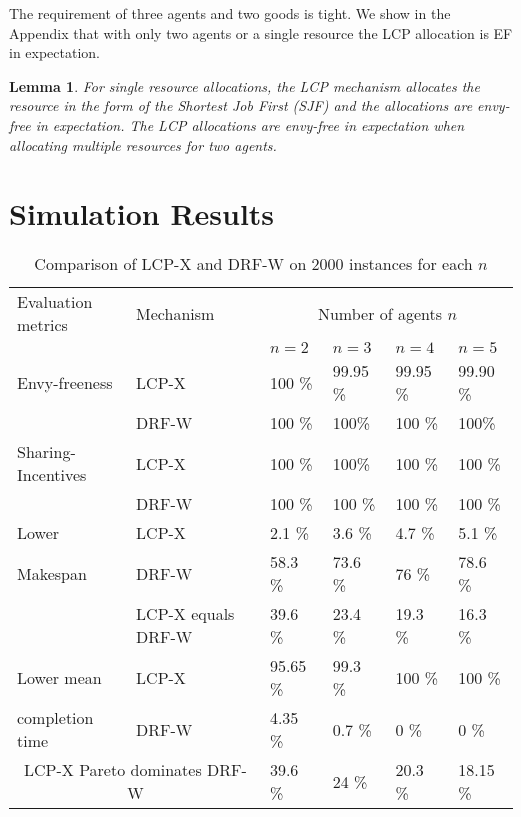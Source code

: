 \documentclass[letterpaper]{article} %
\newtheorem{lemma}{Lemma}
\theoremstyle{definition}
\begin{document}
The requirement of three agents and two goods is tight.  We show in the Appendix that with only two agents or a single resource the LCP allocation is EF in expectation.


\begin{lemma} \label{lcp-1res_and_2agents}
For single resource allocations, the LCP mechanism allocates the resource in the form of the Shortest Job First (SJF) and the allocations are envy-free in expectation. The LCP allocations are envy-free in expectation when allocating multiple resources for two agents.
\end{lemma}

\section{Simulation Results} \label{simulation}

\begin{table*}[t]
\centering
\begin{tabular}{|p{32mm}| p{32mm}| p{15mm}| p{15mm}| p{15mm}|p{15mm}|}
\hline
Evaluation metrics & Mechanism & \multicolumn{4}{c|}{Number of agents $n$}\\
\cline{3-6}
&& $n = 2$ & $n = 3$ & $n = 4$ & $n = 5$\\
\hline
Envy-freeness & LCP-X &  100 \% &  99.95 \% &  99.95 \% &  99.90 \%\\
\cline{2-6}
& DRF-W  &  100 \% &  100\% &  100 \% &  100\%\\
\hline
Sharing-Incentives & LCP-X &  100 \% &  100\% &  100 \% &  100 \%\\
\cline{2-6}
& DRF-W  &  100 \% &  100 \% &  100 \% &  100 \%\\
\hline
Lower & LCP-X &  2.1 \% &  3.6 \% &  4.7 \% &  5.1 \%\\
\cline{2-6}
Makespan & DRF-W  &  58.3 \% &  73.6 \% &  76 \% &  78.6 \%\\
\cline{2-6}
& LCP-X equals DRF-W  &  39.6 \% &  23.4 \% &  19.3 \% &  16.3 \% \\
\hline
Lower mean & LCP-X &  95.65 \% &  99.3 \% &  100 \% &  100 \%\\
\cline{2-6}
completion time & DRF-W &  4.35 \% &  0.7 \% &  0 \% &  0 \%\\
\hline
\multicolumn{2}{|c|}{LCP-X Pareto dominates DRF-W} &  39.6 \% &  24 \% &  20.3 \% &   18.15 \% \\
\hline
\end{tabular}
\caption{\label{tab:1}Comparison of LCP-X and DRF-W on 2000 instances for each $n$}
\end{table*}
\end{document}
